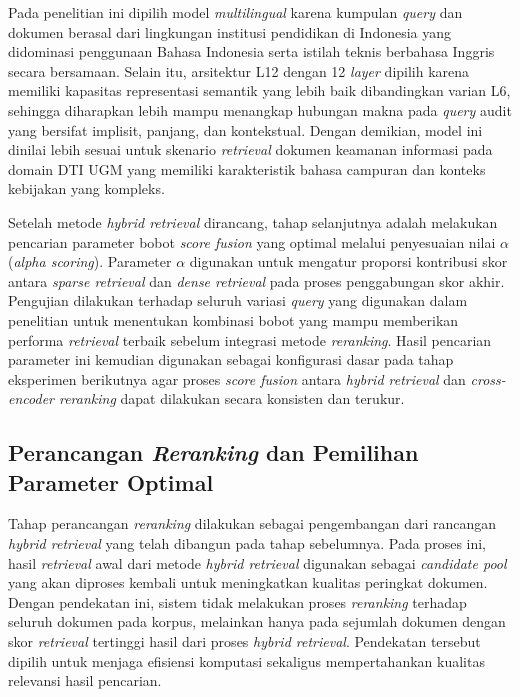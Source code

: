 Pada penelitian ini dipilih model \textit{multilingual} karena kumpulan \textit{query} dan dokumen berasal dari lingkungan institusi pendidikan di Indonesia yang didominasi penggunaan Bahasa Indonesia serta istilah teknis berbahasa Inggris secara bersamaan. Selain itu, arsitektur L12 dengan 12 \textit{layer} dipilih karena memiliki kapasitas representasi semantik yang lebih baik dibandingkan varian L6, sehingga diharapkan lebih mampu menangkap hubungan makna pada \textit{query} audit yang bersifat implisit, panjang, dan kontekstual. Dengan demikian, model ini dinilai lebih sesuai untuk skenario \textit{retrieval} dokumen keamanan informasi pada domain DTI UGM yang memiliki karakteristik bahasa campuran dan konteks kebijakan yang kompleks.

Setelah metode \textit{hybrid retrieval} dirancang, tahap selanjutnya adalah melakukan pencarian parameter bobot \textit{score fusion} yang optimal melalui penyesuaian nilai $\alpha$ (\textit{alpha scoring}). Parameter $\alpha$ digunakan untuk mengatur proporsi kontribusi skor antara \textit{sparse retrieval} dan \textit{dense retrieval} pada proses penggabungan skor akhir. Pengujian dilakukan terhadap seluruh variasi \textit{query} yang digunakan dalam penelitian untuk menentukan kombinasi bobot yang mampu memberikan performa \textit{retrieval} terbaik sebelum integrasi metode \textit{reranking}. Hasil pencarian parameter ini kemudian digunakan sebagai konfigurasi dasar pada tahap eksperimen berikutnya agar proses \textit{score fusion} antara \textit{hybrid retrieval} dan \textit{cross-encoder reranking} dapat dilakukan secara konsisten dan terukur.

\subsection{Perancangan \textit{Reranking} dan Pemilihan Parameter Optimal}

Tahap perancangan \textit{reranking} dilakukan sebagai pengembangan dari rancangan \textit{hybrid retrieval} yang telah dibangun pada tahap sebelumnya. Pada proses ini, hasil \textit{retrieval} awal dari metode \textit{hybrid retrieval} digunakan sebagai \textit{candidate pool} yang akan diproses kembali untuk meningkatkan kualitas peringkat dokumen. Dengan pendekatan ini, sistem tidak melakukan proses \textit{reranking} terhadap seluruh dokumen pada korpus, melainkan hanya pada sejumlah dokumen dengan skor \textit{retrieval} tertinggi hasil dari proses \textit{hybrid retrieval}. Pendekatan tersebut dipilih untuk menjaga efisiensi komputasi sekaligus mempertahankan kualitas relevansi hasil pencarian.

